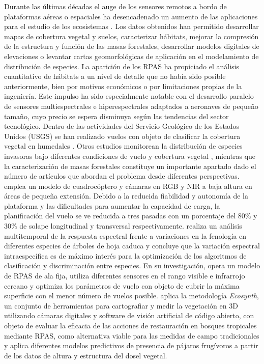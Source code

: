 \documentclass[onecolumn]{extarticle}
\begin{document}
Durante las últimas décadas el auge de los sensores remotos a bordo de
plataformas aéreas o espaciales ha desencadenado un aumento de las
aplicaciones para el estudio de los ecosistemas \citep{Wulder2004}. Los
datos obtenidos han permitido desarrollar mapas de cobertura vegetal y
suelos, caracterizar hábitats, mejorar la compresión de la estructura y
función de las masas forestales, desarrollar modelos digitales de
elevaciones o levantar cartas geomorfológicas de aplicación en el
modelamiento de distribución de especies. La aparición de los RPAS ha
propiciado el análisis cuantitativo de hábitats a un nivel de detalle
que no había sido posible anteriormente, bien por motivos económicos o
por limitaciones propias de la ingeniería. Este impulso ha sido
especialmente notable con el desarrollo paralelo de sensores
multiespectrales e hiperespectrales adaptados a aeronaves de pequeño
tamaño, cuyo precio se espera disminuya según las tendencias del sector
tecnológico. Dentro de las actividades del Servicio Geológico de los
Estados Unidos (USGS) se han realizado vuelos con objeto de clasificar
la cobertura vegetal en humedales \citep{USGS2014}. Otros estudios
monitorean la distribución de especies invasoras bajo diferentes
condiciones de vuelo y cobertura vegetal \citep{Perroy2017}, mientras
que la caracterización de masas forestales constituye un importante
apartado dado el número de artículos que abordan el problema desde
diferentes perspectivas. \citep{Gini2012} emplea un modelo de
cuadrocóptero y cámaras en RGB y NIR a baja altura en áreas de pequeña
extensión. Debido a la reducida fiabilidad y autonomía de la plataforma
y las dificultades para aumentar la capacidad de carga, la planificación
del vuelo se ve reducida a tres pasadas con un porcentaje del 80\% y
30\% de solape longitudinal y transversal respectivamente.
\citep{Lisein2015} realiza un análisis multitemporal de la respuesta
espectral frente a variaciones en la fenología en diferentes especies de
árboles de hoja caduca y concluye que la variación espectral
intraespecífica es de máximo interés para la optimización de los
algoritmos de clasificación y discriminación entre especies. En su
investigación, opera un modelo de RPAS de ala fija, utiliza diferentes
sensores en el rango visible e infrarrojo cercano y optimiza los
parámetros de vuelo con objeto de cubrir la máxima superficie con el
menor número de vuelos posible. \citep{Zahawi2015} aplica la metodología
\emph{Ecosynth}, un conjunto de herramientas para cartografiar y medir
la vegetación en 3D utilizando cámaras digitales y software de visión
artificial de código abierto, con objeto de evaluar la eficacia de las
acciones de restauración en bosques tropicales mediante RPAS, como
alternativa viable para las medidas de campo tradicionales y aplica
diferentes modelos predictivos de presencia de pájaros frugívoros a
partir de los datos de altura y estructura del dosel vegetal.
\end{document}
